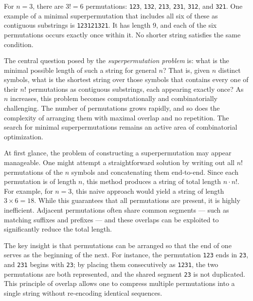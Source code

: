 For \(n = 3\), there are \(3! = 6\) permutations: \texttt{123}, \texttt{132}, \texttt{213}, \texttt{231}, \texttt{312}, and \texttt{321}. One example of a minimal superpermutation that includes all six of these as contiguous substrings is \texttt{123121321}. It has length 9, and each of the six permutations occurs exactly once within it. No shorter string satisfies the same condition.

The central question posed by the \emph{superpermutation problem} is: what is the minimal possible length of such a string for general \(n\)? That is, given \(n\) distinct symbols, what is the shortest string over those symbols that contains every one of their \(n!\) permutations as contiguous substrings, each appearing exactly once? As \(n\) increases, this problem becomes computationally and combinatorially challenging. The number of permutations grows rapidly, and so does the complexity of arranging them with maximal overlap and no repetition. The search for minimal superpermutations remains an active area of combinatorial optimization.

At first glance, the problem of constructing a superpermutation may appear manageable. One might attempt a straightforward solution by writing out all \(n!\) permutations of the \(n\) symbols and concatenating them end-to-end. Since each permutation is of length \(n\), this method produces a string of total length \(n \cdot n!\). For example, for \(n = 3\), this naive approach would yield a string of length \(3 \times 6 = 18\). While this guarantees that all permutations are present, it is highly inefficient. Adjacent permutations often share common segments — such as matching suffixes and prefixes — and these overlaps can be exploited to significantly reduce the total length.

The key insight is that permutations can be arranged so that the end of one serves as the beginning of the next. For instance, the permutation \texttt{123} ends in \texttt{23}, and \texttt{231} begins with \texttt{23}; by placing them consecutively as \texttt{1231}, the two permutations are both represented, and the shared segment \texttt{23} is not duplicated. This principle of overlap allows one to compress multiple permutations into a single string without re-encoding identical sequences.


